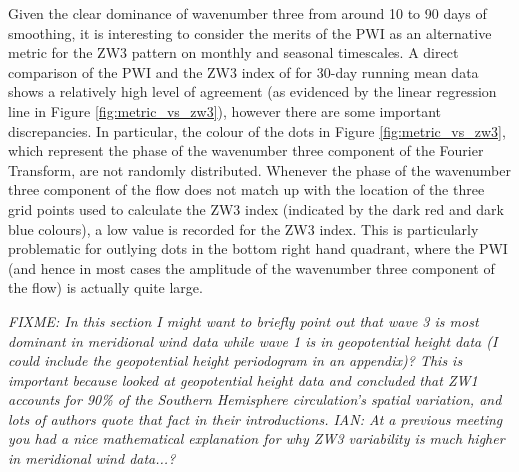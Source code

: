 Given the clear dominance of wavenumber three from around 10 to 90 days of smoothing, it is interesting to consider the merits of the PWI as an alternative metric for the ZW3 pattern on monthly and seasonal timescales. A direct comparison of the PWI and the ZW3 index of \citet{Raphael2004} for 30-day running mean data shows a relatively high level of agreement (as evidenced by the linear regression line in Figure \ref{fig:metric_vs_zw3}), however there are some important discrepancies. In particular, the colour of the dots in Figure \ref{fig:metric_vs_zw3}, which represent the phase of the wavenumber three component of the Fourier Transform, are not randomly distributed. Whenever the phase of the wavenumber three component of the flow does not match up with the location of the three grid points used to calculate the ZW3 index (indicated by the dark red and dark blue colours), a low value is recorded for the ZW3 index. This is particularly problematic for outlying dots in the bottom right hand quadrant, where the PWI (and hence in most cases the amplitude of the wavenumber three component of the flow) is actually quite large.      

\textit{FIXME: In this section I might want to briefly point out that wave 3 is most dominant in meridional wind data while wave 1 is in geopotential height data (I could include the geopotential height periodogram in an appendix)? This is important because \citet{vanLoon1972} looked at geopotential height data and concluded that ZW1 accounts for 90\% of the Southern Hemisphere circulation's spatial variation, and lots of authors quote that fact in their introductions. IAN: At a previous meeting you had a nice mathematical explanation for why ZW3 variability is much higher in meridional wind data...? }